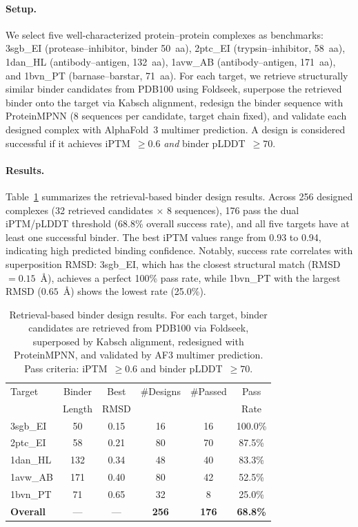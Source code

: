 \documentclass[letterpaper]{article} %
\begin{document}
\paragraph{Setup.} We select five well-characterized protein--protein complexes as benchmarks: 3sgb\_EI (protease--inhibitor, binder 50~aa), 2ptc\_EI (trypsin--inhibitor, 58~aa), 1dan\_HL (antibody--antigen, 132~aa), 1avw\_AB (antibody--antigen, 171~aa), and 1bvn\_PT (barnase--barstar, 71~aa). For each target, we retrieve structurally similar binder candidates from PDB100 using Foldseek, superpose the retrieved binder onto the target via Kabsch alignment, redesign the binder sequence with ProteinMPNN (8 sequences per candidate, target chain fixed), and validate each designed complex with AlphaFold~3 multimer prediction. A design is considered successful if it achieves iPTM~$\geq 0.6$ \emph{and} binder pLDDT~$\geq 70$.

\paragraph{Results.} Table~\ref{tab:binder_results} summarizes the retrieval-based binder design results. Across 256 designed complexes (32 retrieved candidates $\times$ 8 sequences), 176 pass the dual iPTM/pLDDT threshold (68.8\% overall success rate), and all five targets have at least one successful binder. The best iPTM values range from 0.93 to 0.94, indicating high predicted binding confidence. Notably, success rate correlates with superposition RMSD: 3sgb\_EI, which has the closest structural match (RMSD~$= 0.15$~\AA), achieves a perfect 100\% pass rate, while 1bvn\_PT with the largest RMSD ($0.65$~\AA) shows the lowest rate (25.0\%).

\begin{table}[t]
\centering
\small
\caption{Retrieval-based binder design results. For each target, binder candidates are retrieved from PDB100 via Foldseek, superposed by Kabsch alignment, redesigned with ProteinMPNN, and validated by AF3 multimer prediction. Pass criteria: iPTM~$\geq 0.6$ and binder pLDDT~$\geq 70$.}
\label{tab:binder_results}
\begin{tabular}{lccccc}
\toprule
Target & Binder & Best & \#Designs & \#Passed & Pass \\
       & Length & RMSD & & & Rate \\
\midrule
3sgb\_EI & 50  & 0.15 & 16  & 16 & 100.0\% \\
2ptc\_EI & 58  & 0.21 & 80  & 70 & 87.5\%  \\
1dan\_HL & 132 & 0.34 & 48  & 40 & 83.3\%  \\
1avw\_AB & 171 & 0.40 & 80  & 42 & 52.5\%  \\
1bvn\_PT & 71  & 0.65 & 32  & 8  & 25.0\%  \\
\midrule
\textbf{Overall} & --- & --- & \textbf{256} & \textbf{176} & \textbf{68.8\%} \\
\bottomrule
\end{tabular}
\end{table}
\end{document}
